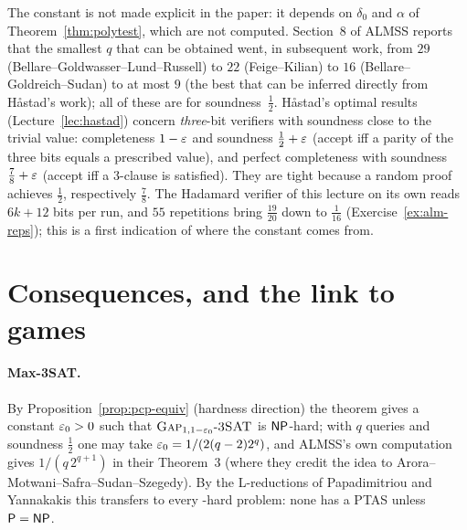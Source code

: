 \begin{remark}
The constant is not made explicit in the paper: it depends on $\delta_0$ and $\alpha$ of Theorem~\ref{thm:polytest}, which are not computed.  Section~8 of ALMSS reports that the smallest $q$ that can be obtained went, in subsequent work, from $29$ (Bellare--Goldwasser--Lund--Russell) to $22$ (Feige--Kilian) to $16$ (Bellare--Goldreich--Sudan) to at most $9$ (the best that can be inferred directly from H\aa stad's work); all of these are for soundness~$\tfrac12$.
H\aa stad's optimal results (Lecture~\ref{lec:hastad}) concern \emph{three}-bit verifiers with soundness close to the trivial value: completeness $1-\varepsilon$ and soundness $\tfrac12+\varepsilon$ (accept iff a parity of the three bits equals a prescribed value), and perfect completeness with soundness $\tfrac78+\varepsilon$ (accept iff a $3$-clause is satisfied).  They are tight because a random proof achieves $\tfrac12$, respectively $\tfrac78$.
The Hadamard verifier of this lecture on its own reads $6k+12$ bits per run, and $55$ repetitions bring $\tfrac{19}{20}$ down to $\tfrac1{16}$ (Exercise~\ref{ex:alm-reps}); this is a first indication of where the constant comes from.
\end{remark}


\section{Consequences, and the link to games}
\label{sec:alm-cons}

\paragraph{Max-3SAT.}  By Proposition~\ref{prop:pcp-equiv} (hardness direction) the theorem gives a constant $\varepsilon_0>0$ such that $\textsc{Gap}_{1,1-\varepsilon_0}\text{-}\textsc{3SAT}$ is $\mathsf{NP}$-hard; with $q$ queries and soundness $\tfrac12$ one may take $\varepsilon_0=1/(2(q-2)2^q)$, and ALMSS's own computation gives $1/(q\,2^{q+1})$ in their Theorem~3 (where they credit the idea to Arora--Motwani--Safra--Sudan--Szegedy).
By the L-reductions of Papadimitriou and Yannakakis this transfers to every -hard problem: none has a PTAS unless $\mathsf{P}=\mathsf{NP}$.

